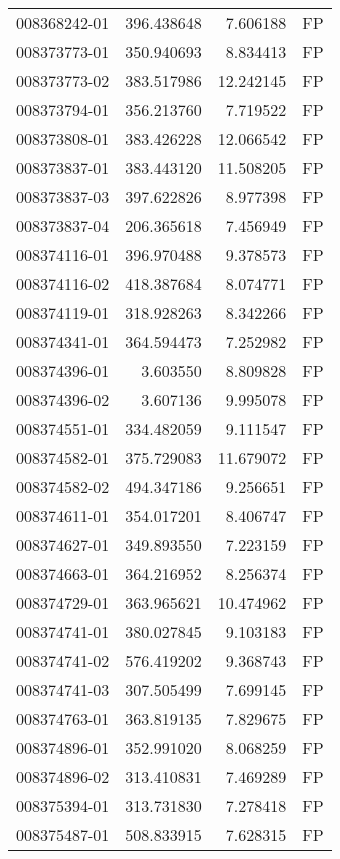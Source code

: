 \begin{tabular}{lrrl}
008368242-01 &  396.438648 &     7.606188 &   FP \\
008373773-01 &  350.940693 &     8.834413 &   FP \\
008373773-02 &  383.517986 &    12.242145 &   FP \\
008373794-01 &  356.213760 &     7.719522 &   FP \\
008373808-01 &  383.426228 &    12.066542 &   FP \\
008373837-01 &  383.443120 &    11.508205 &   FP \\
008373837-03 &  397.622826 &     8.977398 &   FP \\
008373837-04 &  206.365618 &     7.456949 &   FP \\
008374116-01 &  396.970488 &     9.378573 &   FP \\
008374116-02 &  418.387684 &     8.074771 &   FP \\
008374119-01 &  318.928263 &     8.342266 &   FP \\
008374341-01 &  364.594473 &     7.252982 &   FP \\
008374396-01 &    3.603550 &     8.809828 &   FP \\
008374396-02 &    3.607136 &     9.995078 &   FP \\
008374551-01 &  334.482059 &     9.111547 &   FP \\
008374582-01 &  375.729083 &    11.679072 &   FP \\
008374582-02 &  494.347186 &     9.256651 &   FP \\
008374611-01 &  354.017201 &     8.406747 &   FP \\
008374627-01 &  349.893550 &     7.223159 &   FP \\
008374663-01 &  364.216952 &     8.256374 &   FP \\
008374729-01 &  363.965621 &    10.474962 &   FP \\
008374741-01 &  380.027845 &     9.103183 &   FP \\
008374741-02 &  576.419202 &     9.368743 &   FP \\
008374741-03 &  307.505499 &     7.699145 &   FP \\
008374763-01 &  363.819135 &     7.829675 &   FP \\
008374896-01 &  352.991020 &     8.068259 &   FP \\
008374896-02 &  313.410831 &     7.469289 &   FP \\
008375394-01 &  313.731830 &     7.278418 &   FP \\
008375487-01 &  508.833915 &     7.628315 &   FP \\

\end{tabular}
